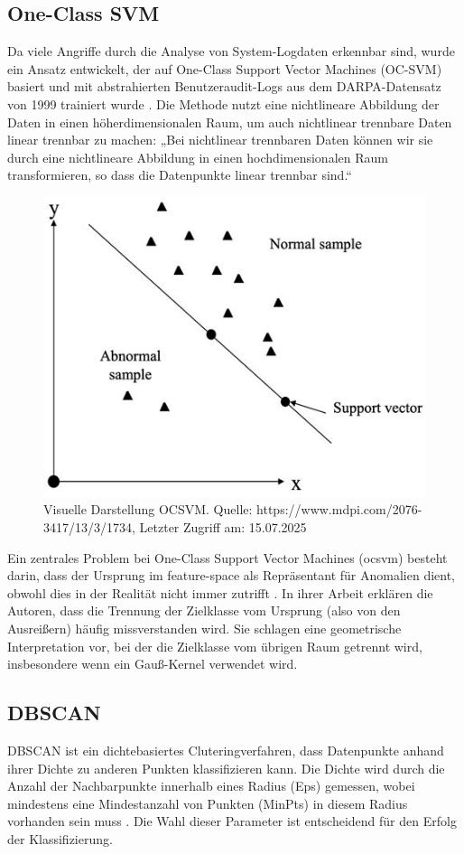 \documentclass[a4paper,12pt]{article}
\begin{document}
	\subsection{One-Class SVM}
	Da viele Angriffe durch die Analyse von System-Logdaten erkennbar sind, wurde ein Ansatz entwickelt, der auf One-Class Support Vector Machines (OC-SVM) basiert und mit abstrahierten Benutzeraudit-Logs aus dem DARPA-Datensatz von 1999 trainiert wurde \cite{li2003improving}. Die Methode nutzt eine nichtlineare Abbildung der Daten in einen höherdimensionalen Raum, um auch nichtlinear trennbare Daten linear trennbar zu machen:
	„Bei nichtlinear trennbaren Daten können wir sie durch eine nichtlineare Abbildung in einen hochdimensionalen Raum transformieren, so dass die Datenpunkte linear trennbar sind.“
	\\[0.5em]
	\begin{figure}
		\centering
		\includegraphics[width=0.7\linewidth]{Bilder/screenshot006}
		\caption{Visuelle Darstellung  OCSVM. Quelle: https://www.mdpi.com/2076-3417/13/3/1734, Letzter Zugriff am: 15.07.2025}
		\label{fig:screenshot006}
	\end{figure}
	Ein zentrales Problem bei One-Class Support Vector Machines (\gls{ocsvm}) besteht darin, dass der Ursprung im \gls{feature-space} als Repräsentant für Anomalien dient, obwohl dies in der Realität nicht immer zutrifft \cite{bounsiar2025oneclass}. In ihrer Arbeit erklären die Autoren, dass die Trennung der Zielklasse vom Ursprung (also von den Ausreißern) häufig missverstanden wird. Sie schlagen eine geometrische Interpretation vor, bei der die Zielklasse vom übrigen Raum getrennt wird, insbesondere wenn ein Gauß-Kernel verwendet wird.
	
	\subsection{DBSCAN}
	DBSCAN ist ein dichtebasiertes Cluteringverfahren, dass Datenpunkte anhand ihrer Dichte zu anderen Punkten klassifizieren kann.
	Die Dichte wird durch die Anzahl der Nachbarpunkte innerhalb eines Radius (Eps) gemessen, wobei mindestens eine Mindestanzahl von Punkten (MinPts) in diesem Radius vorhanden sein muss \cite{ester1996dbscan}. Die Wahl dieser Parameter ist entscheidend für den Erfolg der Klassifizierung.
	
\end{document}
